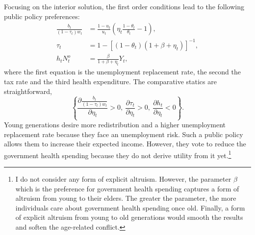 Focusing on the interior solution, the first order conditions lead to the following public policy preferences:
	\begin{align}
		\frac{b_t}{(1-\tau_t)w_t} &= \frac{1-u_t}{u_t} \left(\eta_t\frac{1-\theta_t}{\theta_t}- 1\right),
		\label{eq:inverse_replacement_rate}\\
		\tau_t &= 1 - \left[\left(1-\theta_t\right)\left(1+\beta+\eta_t\right)\right]^{-1},
		\label{eq:tax_rate} \\
		h_t N^o_t &= \frac{\beta}{1+\beta+\eta_t}Y_t,
		\label{eq:health_expenditure}
	\end{align}
where the first equation is the unemployment replacement rate, the second the tax rate and the third health expenditure. The comparative statics are straightforward,
	\begin{equation*}
		\left\lbrace \frac{\partial \frac{b_t}{(1-\tau_t)w_t}}{\partial \eta_t} > 0, ~ \frac{\partial \tau_t}{\partial \eta_t} > 0, ~\frac{\partial h_t}{\partial \eta_t} < 0\right\rbrace.
	\end{equation*}
Young generations desire more redistribution and a higher unemployment replacement rate because they face an unemployment risk. Such a public policy allows them to increase their expected income. However, they vote to reduce the government health spending because they do not derive utility from it yet.\footnote{I do not consider any form of explicit altruism. However, the parameter $\beta$ which is the preference for government health spending captures a form of altruism from young to their elders. The greater the parameter, the more individuals care about government health spending once old. Finally, a form of explicit altruism from young to old generations would smooth the results and soften the age-related conflict.}

